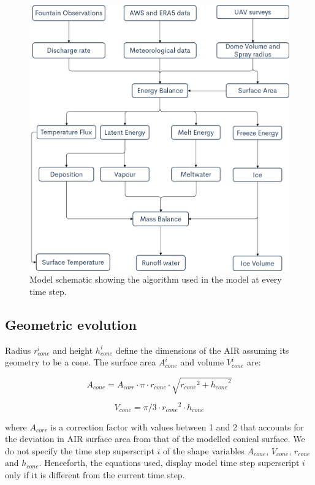 \documentclass[utf8]{frontiersSCNS} %
\begin{document}
\begin{figure}
	\begin{center}
		\includegraphics[width=12 cm]{Figures/model_schematic.png}
	\end{center}
	\caption{Model schematic showing the algorithm used in the model at every time step. }
	\label{fig:schema}
\end{figure}

\subsection{Geometric evolution}

Radius $r_{cone}^i$ and height $h_{cone}^i$ define the dimensions of the AIR assuming its geometry to be a cone.
The surface area $A_{cone}^i$ and volume $V_{cone}^i$ are:

\begin{equation} A_{cone} = A_{corr} \cdot \pi \cdot r_{cone} \cdot \sqrt{{r_{cone}}^2 + {h_{cone}}^ 2} \label{eqn:A} \end{equation}

\begin{equation} V_{cone} = \pi/3 \cdot {r_{cone}}^2 \cdot h_{cone} \label{eqn:V} \end{equation}

where $A_{corr}$ is a correction factor with values between 1 and 2 that accounts for the deviation in AIR
surface area from that of the modelled conical surface. We do not specify the time step superscript $i$ of the
shape variables $A_{cone}$, $V_{cone}$, $r_{cone}$ and $h_{cone}$. Henceforth, the equations used, display model time step
superscript $i$ only if it is different from the current time step.
\end{document}

